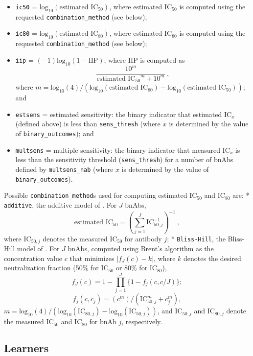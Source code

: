 \documentclass[]{article}
\providecommand{\tightlist}{%
  \setlength{\itemsep}{0pt}\setlength{\parskip}{0pt}}
\begin{document}
\begin{itemize}
\tightlist
\item
  \texttt{ic50} = \(\mbox{log}_{10}(\mbox{estimated IC}_{50})\), where
  estimated IC\(_{50}\) is computed using the requested
  \texttt{combination\_method} (see below);
\item
  \texttt{ic80} = \(\mbox{log}_{10}(\mbox{estimated IC}_{80})\), where
  estimated IC\(_{80}\) is computed using the requested
  \texttt{combination\_method} (see below);
\item
  \texttt{iip} = \((-1)\mbox{log}_{10}(1 - \mbox{IIP})\), where IIP is
  computed as \[ \frac{10^m}{\mbox{estimated IC$_{50}$}^m + 10^m} \ , \]
  where
  \(m = \mbox{log}_{10}(4) / (\mbox{log}_{10}(\mbox{estimated IC}_{80}) - \mbox{log}_{10}(\mbox{estimated IC}_{50}))\);
  and
\item
  \texttt{estsens} = estimated sensitivity: the binary indicator that
  estimated IC\(_{x}\) (defined above) is less than
  \texttt{sens\_thresh} (where \(x\) is determined by the value of
  \texttt{binary\_outcomes}); and
\item
  \texttt{multsens} = multiple sensitivity: the binary indicator that
  measured IC\(_{x}\) is less than the sensitivity threshold
  (\texttt{sens\_thresh}) for a number of bnAbs defined by
  \texttt{multsens\_nab} (where \(x\) is determined by the value of
  \texttt{binary\_outcomes}).
\end{itemize}

Possible \texttt{combination\_method}s used for computing estimated
IC\(_{50}\) and IC\(_{80}\) are: * \texttt{additive}, the additive model
of \citet{wagh2016optimal}. For \(J\) bnAbs,
\[ \mbox{estimated IC}_{50} = \left( \sum_{j=1}^J \mbox{IC}_{50,j}^{-1} \right)^{-1} \ , \]
where IC\(_{50,j}\) denotes the measured IC\(_{50}\) for antibody \(j\);
* \texttt{Bliss-Hill}, the Bliss-Hill model of \citet{wagh2016optimal}.
For \(J\) bnAbs, computed using Brent's algorithm \citep{brent1971} as
the concentration value \(c\) that minimizes
\(\lvert f_J(c) - k \rvert\), where \(k\) denotes the desired
neutralization fraction (50\% for IC\(_{50}\) or 80\% for IC\(_{80}\)),
\[ f_J(c) = 1 - \prod_{j = 1}^J \{1 - f_j(c, c / J)\}; \]
\[ f_j(c, c_j) = (c^m) / (\mbox{IC}_{50,j}^m + c_j^m), \]
\(m = \mbox{log}_{10}(4) / (\mbox{log}_{10}(\mbox{IC}_{80,j}) - \mbox{log}_{10}(\mbox{IC}_{50,j}))\),
and IC\(_{50,j}\) and IC\(_{80,j}\) denote the measured IC\(_{50}\) and
IC\(_{80}\) for bnAb \(j\), respectively.

\subsection{Learners}\label{sec:learnerdetails}
\end{document}
